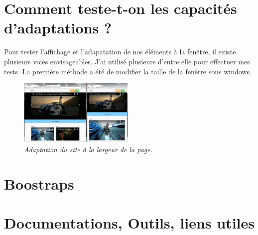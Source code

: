 \documentclass{article}
\begin{document}
\section{Comment teste-t-on les capacit\'es d'adaptations ?}

\hspace*{0.6cm}Pour tester l'affichage et l'adapatation de nos \'el\'ements \`a la fen\^etre, il existe plusieurs voies envisageables. J'ai utilis\'e plusieurs d'entre elle pour effectuer mes tests. La premi\`ere m\'ethode a \'et\'e de modifier la taille de la fen\^etre sous windows.\\
\begin{figure}
\vspace{-12pt}
\centering
\includegraphics[width=5.5cm]{double}
\caption{\textit{Adaptation du site \`a la largeur de la page.}}
\end{figure} 
\lipsum[1]

\par

\newpage

\section{Boostraps}


\section{Documentations, Outils, liens utiles} 
\end{document}
